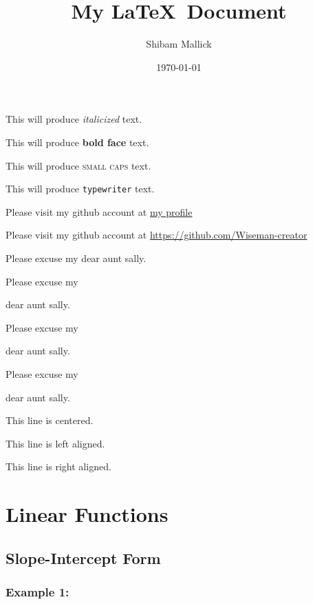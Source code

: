 \documentclass{article}
\title{My \LaTeX\ Document}
\author{Shibam Mallick}
\date{\today}
\begin{document}
\tableofcontents
\maketitle

This will produce \textit{italicized} text.

This will produce \textbf{bold face} text.

This will produce \textsc{small caps} text.

This will produce \texttt{typewriter} text.

Please visit my github account at 
\href{https://github.com/Wiseman-creator}{my profile}

Please visit my github account at 
\url{https://github.com/Wiseman-creator}

\vspace{1cm}

Please excuse my dear aunt sally.

Please excuse my \begin{large}
    dear aunt sally.
\end{large}

Please excuse my \begin{Large}
    dear aunt sally.
\end{Large}

Please excuse my \begin{huge}
    dear aunt sally.
\end{huge}

\vspace{1 cm}

\begin{center} This line is centered.\end{center}

\begin{flushright} This line is left aligned.\end{flushright}

\begin{flushleft} This line is right aligned.\end{flushleft}

\section{Linear Functions}
    \subsection{Slope-Intercept Form}
        \subsubsection{Example 1:}
\end{document}
